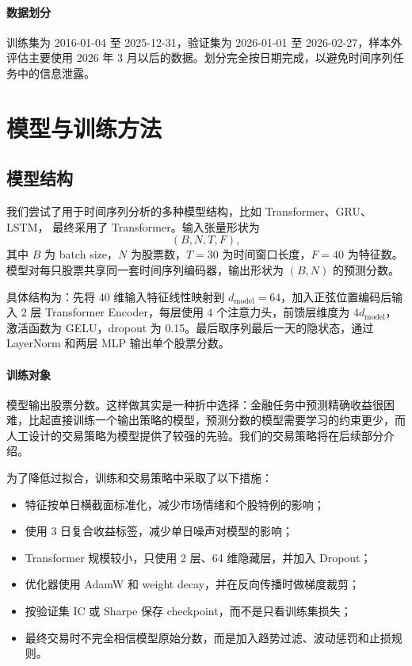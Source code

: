 \documentclass[fontset=mac]{ctexart}
\begin{document}
\paragraph{数据划分}
训练集为 2016-01-04 至 2025-12-31，验证集为 2026-01-01 至 2026-02-27，样本外评估主要使用 2026 年 3 月以后的数据。划分完全按日期完成，以避免时间序列任务中的信息泄露。

\section{模型与训练方法}

\subsection{模型结构}

我们尝试了用于时间序列分析的多种模型结构，比如 Transformer、GRU、LSTM，
最终采用了 Transformer。输入张量形状为
\[
    (B, N, T, F),
\]
其中 $B$ 为 batch size，$N$ 为股票数，$T=30$ 为时间窗口长度，$F=40$ 为特征数。模型对每只股票共享同一套时间序列编码器，输出形状为 $(B,N)$ 的预测分数。

具体结构为：先将 40 维输入特征线性映射到 $d_{\mathrm{model}}=64$，加入正弦位置编码后输入 2 层 Transformer Encoder，每层使用 4 个注意力头，前馈层维度为 $4d_{\mathrm{model}}$，激活函数为 GELU，dropout 为 0.15。最后取序列最后一天的隐状态，通过 LayerNorm 和两层 MLP 输出单个股票分数。

\paragraph{训练对象} 模型输出股票分数。这样做其实是一种折中选择：金融任务中预测精确收益很困难，比起直接训练一个输出策略的模型，预测分数的模型需要学习的约束更少，而人工设计的交易策略为模型提供了较强的先验。我们的交易策略将在后续部分介绍。

为了降低过拟合，训练和交易策略中采取了以下措施：
\begin{itemize}[noitemsep]
    \item 特征按单日横截面标准化，减少市场情绪和个股特例的影响；
    \item 使用 3 日复合收益标签，减少单日噪声对模型的影响；
    \item Transformer 规模较小，只使用 2 层、64 维隐藏层，并加入 Dropout；
    \item 优化器使用 AdamW 和 weight decay，并在反向传播时做梯度裁剪；
    \item 按验证集 IC 或 Sharpe 保存 checkpoint，而不是只看训练集损失；
    \item 最终交易时不完全相信模型原始分数，而是加入趋势过滤、波动惩罚和止损规则。
\end{itemize}
\end{document}

